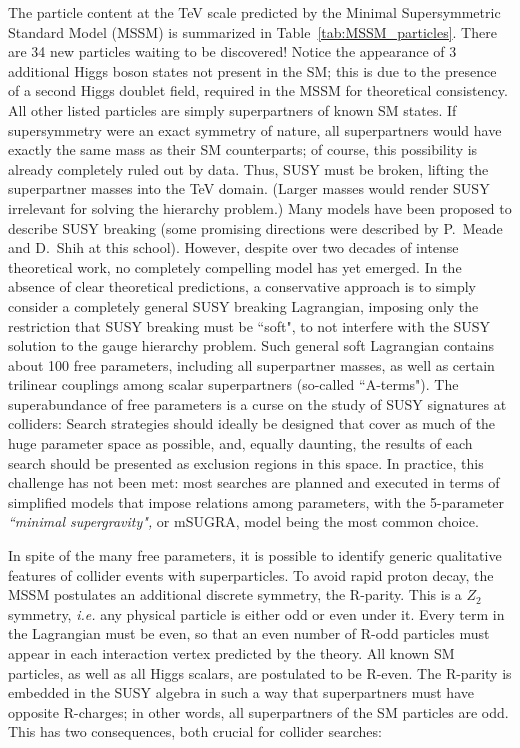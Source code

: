 \documentclass{ws-procs9x6}
\begin{document}
The particle content at the TeV scale predicted by the Minimal Supersymmetric Standard Model (MSSM) is summarized in Table~\ref{tab:MSSM_particles}. There are 34 new particles waiting to be discovered! Notice the appearance of 3 additional Higgs boson states not present in the SM; this is due to the presence of a second Higgs doublet field, required in the MSSM for theoretical consistency. All other listed particles are simply superpartners of known SM states. If supersymmetry were an exact symmetry of nature, all superpartners would have exactly the same mass as their SM counterparts; of course, this possibility is already completely ruled out by data. Thus, SUSY must be broken, lifting the superpartner masses into the TeV domain. (Larger masses would render SUSY irrelevant for solving the hierarchy problem.) Many models have been proposed to describe SUSY breaking (some promising directions were described by P.~Meade and D.~Shih at this school). However, despite over two decades of intense theoretical work, no completely compelling model has yet emerged. In the absence of clear theoretical predictions, a conservative approach is to simply consider a completely general SUSY breaking Lagrangian, imposing only the restriction that SUSY breaking must be ``soft", to not interfere with the SUSY solution to the gauge hierarchy problem. Such general soft Lagrangian contains about 100 free parameters, including all superpartner masses, as well as certain trilinear couplings among scalar superpartners (so-called ``A-terms"). The superabundance of free parameters is a curse on the study of SUSY signatures at colliders: Search strategies should ideally be designed that cover as much of the huge parameter space as possible, and, equally daunting, the results of each search should be presented as exclusion regions in this space. In practice, this challenge has not been met: most searches are planned and executed in terms of simplified models that impose relations among parameters, with the 5-parameter {\it ``minimal supergravity",} or mSUGRA, model being the most common choice.  

In spite of the many free parameters, it is possible to identify generic qualitative features of collider events with superparticles. To avoid rapid proton decay, the MSSM postulates an additional discrete symmetry, the R-parity. This is a $Z_2$ symmetry, {\it i.e.} any physical particle is either odd or even under it. Every term in the Lagrangian must be even, so that an even number of R-odd particles must appear in each interaction vertex predicted by the theory. All known SM particles, as well as all Higgs scalars, are postulated to be R-even. The R-parity is embedded in the SUSY algebra in such a way that superpartners must have opposite R-charges; in other words, all superpartners of the SM particles are odd. This has two consequences, both crucial for collider searches:
\end{document}
